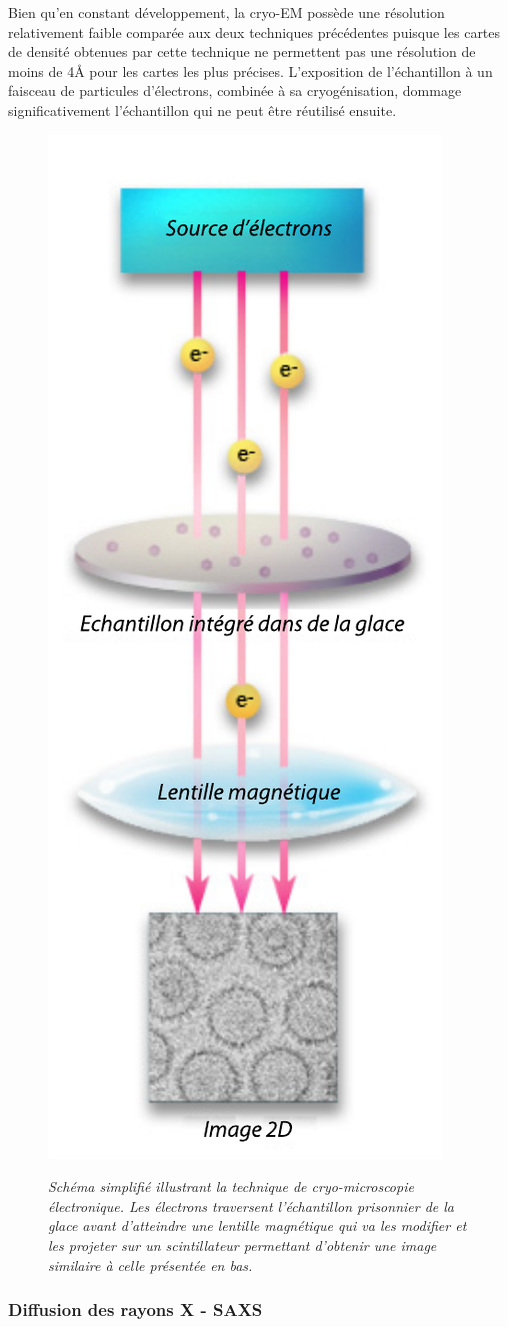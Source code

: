 Bien qu'en constant développement, la cryo-EM possède une résolution relativement faible comparée aux deux techniques précédentes puisque les cartes de densité obtenues par cette technique ne permettent pas une résolution de moins de 4\r{A} pour les cartes les plus précises\cite{zhou_atomic_2011}. L'exposition de l'échantillon à un faisceau de particules d'électrons, combinée à sa cryogénisation, dommage significativement l'échantillon qui ne peut être réutilisé ensuite.

\begin{figure}
  \centering
  {\includegraphics[width=0.4\linewidth]{./figures/ch1/cryoem.pdf}}
    \caption{\it Schéma simplifié illustrant la technique de cryo-microscopie électronique. Les électrons traversent l'échantillon prisonnier de la glace avant d'atteindre une lentille magnétique qui va les modifier et les projeter sur un scintillateur permettant d'obtenir une image similaire à celle présentée en bas.}
    \label{Fig:cryoem}
  \hspace{0.2cm}
\end{figure}

\subsubsection{Diffusion des rayons X - SAXS}

